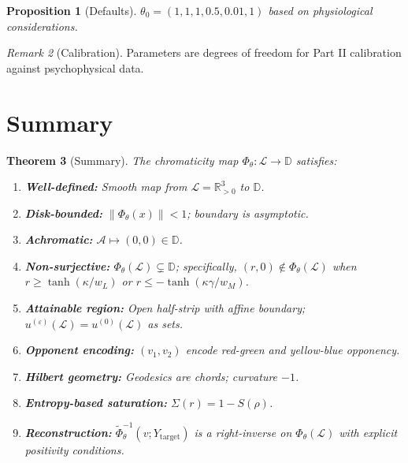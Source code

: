 \documentclass[11pt]{article}
\theoremstyle{plain}
\newtheorem{theorem}{Theorem}[section]
\newtheorem{proposition}[theorem]{Proposition}
\theoremstyle{definition}
\theoremstyle{remark}
\newtheorem{remark}[theorem]{Remark}
\newcommand{\Rpp}{\mathbb{R}_{> 0}}     %
\newcommand{\D}{\mathbb{D}}
\newcommand{\norm}[1]{\left\lVert #1 \right\rVert}
\begin{document}
\begin{proposition}[Defaults]
$\theta_0 = (1, 1, 1, 0.5, 0.01, 1)$ based on physiological considerations.
\end{proposition}

\begin{remark}[Calibration]
Parameters are degrees of freedom for Part II calibration against psychophysical data.
\end{remark}

\section{Summary}
\label{sec:summary}

\begin{theorem}[Summary]
The chromaticity map $\Phi_\theta: \mathcal{L} \to \D$ satisfies:
\begin{enumerate}[label=(\arabic*)]
    \item \textbf{Well-defined:} Smooth map from $\mathcal{L} = \Rpp^3$ to $\D$.
    \item \textbf{Disk-bounded:} $\norm{\Phi_\theta(x)} < 1$; boundary is asymptotic.
    \item \textbf{Achromatic:} $\mathcal{A} \mapsto (0,0) \in \D$.
    \item \textbf{Non-surjective:} $\Phi_\theta(\mathcal{L}) \subsetneq \D$; specifically, $(r, 0) \notin \Phi_\theta(\mathcal{L})$ when $r \geq \tanh(\kappa/w_L)$ or $r \leq -\tanh(\kappa\gamma/w_M)$.
    \item \textbf{Attainable region:} Open half-strip with affine boundary; $u^{(\varepsilon)}(\mathcal{L}) = u^{(0)}(\mathcal{L})$ as sets.
    \item \textbf{Opponent encoding:} $(v_1, v_2)$ encode red-green and yellow-blue opponency.
    \item \textbf{Hilbert geometry:} Geodesics are chords; curvature $-1$.
    \item \textbf{Entropy-based saturation:} $\Sigma(r) = 1 - S(\rho)$.
    \item \textbf{Reconstruction:} $\widetilde{\Phi}_\theta^{-1}(v; Y_{\mathrm{target}})$ is a right-inverse on $\Phi_\theta(\mathcal{L})$ with explicit positivity conditions.
\end{enumerate}
\end{theorem}
\end{document}
